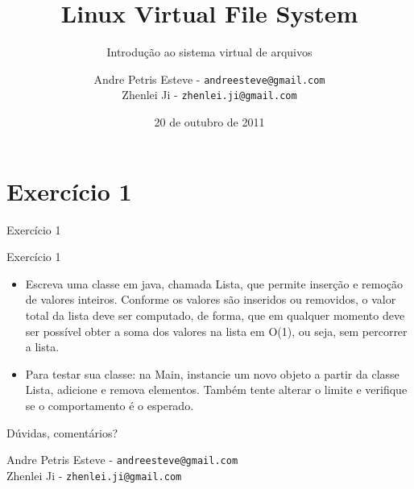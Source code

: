 \documentclass{beamer}
\author[Andre P. Esteve e Zhenlei Ji]{
Andre Petris Esteve - \texttt{andreesteve@gmail.com}\\
Zhenlei Ji - \texttt{zhenlei.ji@gmail.com}}
\institute[IC\textbackslash UNICAMP]{
MC806 - Tópicos em sistemas operacionais\\}
\title[Linux VFS]{Linux Virtual File System}
\subtitle[]{Introdução ao sistema virtual de arquivos}
\date[20/10/2011]{20 de outubro de 2011}
\begin{document}

\begin{frame}[plain]
  \titlepage
\end{frame}

\section{Exercício 1}

\begin{frame}{Exercício 1}

  \begin{block}{Exercício 1}

    \begin{itemize}

    \item{Escreva uma classe em java, chamada Lista, que permite inserção e remoção de valores inteiros.
Conforme os valores são inseridos ou removidos, o valor total da lista deve ser computado, de forma, que em qualquer
momento deve ser possível obter a soma dos valores na lista em O(1), ou seja, sem percorrer a lista.}

    \item{Para testar sua classe: na Main, instancie um novo objeto a partir da classe Lista, adicione e remova elementos. Também tente alterar o limite e verifique se o comportamento é o esperado.}

    \end{itemize}

  \end{block}

\end{frame}



\begin{frame}[plain]

  \begin{center}
    \Huge Dúvidas, comentários?
  \end{center}

  \vspace{0.2in}

  \begin{center}
	Andre Petris Esteve - \texttt{andreesteve@gmail.com}\\
	Zhenlei Ji - \texttt{zhenlei.ji@gmail.com}
  \end{center}
\end{frame}
\end{document}
